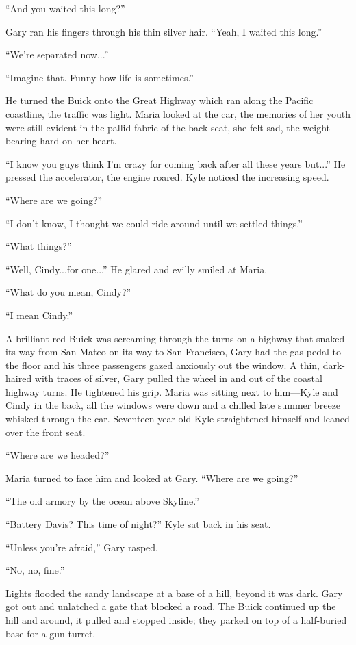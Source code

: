 ``And you waited this long?''

Gary ran his fingers through his thin silver hair. ``Yeah, I waited this
long.''

``We're separated now...''

``Imagine that. Funny how life is sometimes.''

He turned the Buick onto the Great Highway which ran along the Pacific
coastline, the traffic was light. Maria looked at the car, the memories
of her youth were still evident in the pallid fabric of the back seat,
she felt sad, the weight bearing hard on her heart.

``I know you guys think I'm crazy for coming back after all these years
but...'' He pressed the accelerator, the engine roared. Kyle noticed the
increasing speed.

``Where are we going?''

``I don't know, I thought we could ride around until we settled
things.''

``What things?''

``Well, Cindy...for one...'' He glared and evilly smiled at Maria.

``What do you mean, Cindy?''

``I mean Cindy.''

A brilliant red Buick was screaming through the turns on a highway that
snaked its way from San Mateo on its way to San Francisco, Gary had the
gas pedal to the floor and his three passengers gazed anxiously out the
window. A thin, dark-haired with traces of silver, Gary pulled the wheel
in and out of the coastal highway turns. He tightened his grip. Maria
was sitting next to him---Kyle and Cindy in the back, all the windows
were down and a chilled late summer breeze whisked through the car.
Seventeen year-old Kyle straightened himself and leaned over the front
seat.

``Where are we headed?''

Maria turned to face him and looked at Gary. ``Where are we going?''

``The old armory by the ocean above Skyline.''

``Battery Davis? This time of night?'' Kyle sat back in his seat.

``Unless you're afraid,'' Gary rasped.

``No, no, fine.''

Lights flooded the sandy landscape at a base of a hill, beyond it was
dark. Gary got out and unlatched a gate that blocked a road. The Buick
continued up the hill and around, it pulled and stopped inside; they
parked on top of a half-buried base for a gun turret.

